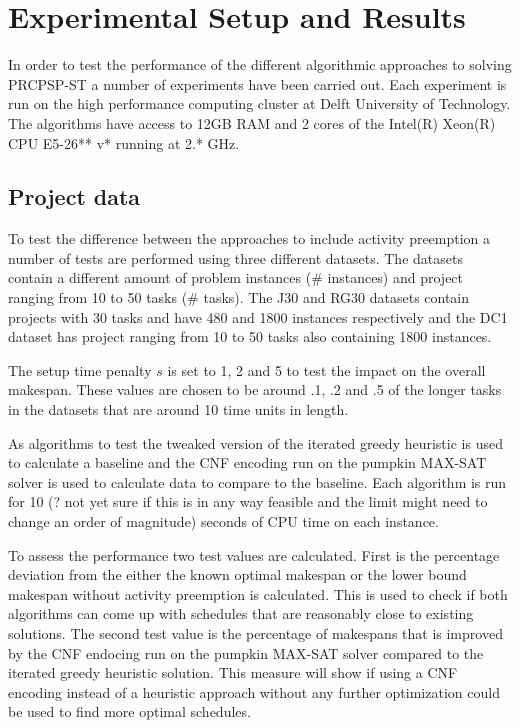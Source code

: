\section{Experimental Setup and Results}
In order to test the performance of the different algorithmic approaches to solving PRCPSP-ST a number of experiments have been carried out.
Each experiment is run on the high performance computing cluster at Delft University of Technology. The algorithms have access to 12GB RAM and 2 cores of the Intel(R) Xeon(R) CPU E5-26** v* running at 2.* GHz.

\subsection{Project data}
To test the difference between the approaches to include activity preemption a number of tests are performed using three different datasets. The datasets contain a different amount of problem instances (\# instances) and project ranging from 10 to 50 tasks (\# tasks). The J30 and RG30 datasets contain projects with 30 tasks and have 480 and 1800 instances respectively and the DC1 dataset has project ranging from 10 to 50 tasks also containing 1800 instances.

The setup time penalty \(s\) is set to 1, 2 and 5 to test the impact on the overall makespan. These values are chosen to be around .1, .2 and .5 of the longer tasks in the datasets that are around 10 time units in length.

As algorithms to test the tweaked version of the iterated greedy heuristic is used to calculate a baseline and the CNF encoding run on the pumpkin MAX-SAT solver is used to calculate data to compare to the baseline. Each algorithm is run for 10 (? not yet sure if this is in any way feasible and the limit might need to change an order of magnitude) seconds of CPU time on each instance.

To assess the performance two test values are calculated. First is the percentage deviation from the either the known optimal makespan or the lower bound makespan without activity preemption is calculated. This is used to check if both algorithms can come up with schedules that are reasonably close to existing solutions. The second test value is the percentage of makespans that is improved by the CNF endocing run on the pumpkin MAX-SAT solver compared to the iterated greedy heuristic solution. This measure will show if using a CNF encoding instead of a heuristic approach without any further optimization could be used to find more optimal schedules.

